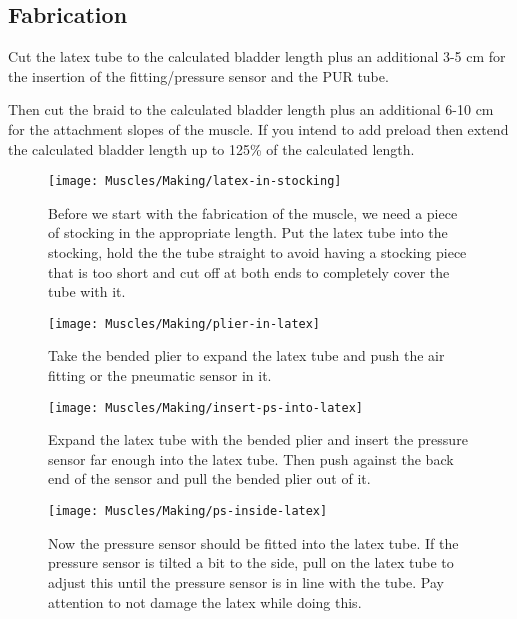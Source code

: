 \documentclass[main]{subfiles}
\begin{document}
\subsection{Fabrication}

Cut the latex tube to the calculated bladder length plus an additional 3-5 cm for the insertion of the fitting/pressure sensor and the PUR tube.

Then cut the braid to the calculated bladder length plus an additional 6-10 cm for the attachment slopes of the muscle. If you intend to add preload then extend the calculated bladder length up to 125\% of the calculated length.

\begin{figure}[H]
\centering
\texttt{[image: Muscles/Making/latex-in-stocking]}
\caption[Latex tube fits stocking]{Before we start with the fabrication of the muscle, we need a piece of stocking in the appropriate length. Put the latex tube into the stocking, hold the the tube straight to avoid having a stocking piece that is too short and cut off at both ends to completely cover the tube with it. }
\label{latex-in-stocking}
\end{figure}

\begin{figure}[H]
\centering
\texttt{[image: Muscles/Making/plier-in-latex]}
\caption[Plier in latex tube]{Take the bended plier to expand the latex tube and push the air fitting or the pneumatic sensor in it.}
\label{plier-in-latex}
\end{figure}


\begin{figure}[H]
\centering
\texttt{[image: Muscles/Making/insert-ps-into-latex]}
\caption[Pressure sensor in latex tube]{Expand the latex tube with the bended plier and insert the pressure sensor far enough into the latex tube. Then push against the back end of the sensor and pull the bended plier out of it.}
\label{insert-ps-into-latex}
\end{figure}


\begin{figure}[H]
\centering
\texttt{[image: Muscles/Making/ps-inside-latex]}
\caption[Pressure sensor fitted with latex tube]{Now the pressure sensor should be fitted into the latex tube. If the pressure sensor is tilted a bit to the side, pull on the latex tube to adjust this until the pressure sensor is in line with the tube. Pay attention to not damage the latex while doing this.}
\label{ps-inside-latex}
\end{figure}
\end{document}
